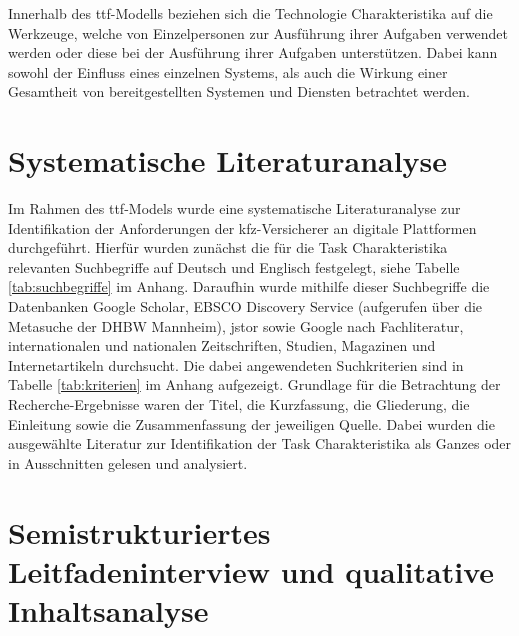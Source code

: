 Innerhalb des \acs{ttf}-Modells beziehen sich die Technologie Charakteristika auf die Werkzeuge, welche von Einzelpersonen zur Ausführung ihrer Aufgaben verwendet werden oder diese bei der Ausführung ihrer Aufgaben unterstützen.\autocite[Vgl.][S. 399]{SPIES2020} Dabei kann sowohl der Einfluss eines einzelnen Systems, als auch die Wirkung einer Gesamtheit von bereitgestellten Systemen und Diensten betrachtet werden. \autocite[Vgl.][S. 216]{GOODHUE1995}





\section{Systematische Literaturanalyse}


Im Rahmen des \acs{ttf}-Models wurde eine systematische Literaturanalyse zur Identifikation der Anforderungen der \ac{kfz}-Versicherer an digitale Plattformen durchgeführt. Hierfür wurden zunächst die für die Task Charakteristika relevanten Suchbegriffe auf Deutsch und Englisch festgelegt, siehe Tabelle \ref{tab:suchbegriffe} im Anhang. Daraufhin wurde mithilfe dieser Suchbegriffe die Datenbanken Google Scholar, EBSCO Discovery Service (aufgerufen über die Metasuche der DHBW Mannheim), \ac{jstor} sowie Google nach Fachliteratur, internationalen und nationalen Zeitschriften, Studien, Magazinen und Internetartikeln durchsucht. Die dabei angewendeten Suchkriterien sind in Tabelle \ref{tab:kriterien} im Anhang aufgezeigt. Grundlage für die Betrachtung der Recherche-Ergebnisse waren der Titel, die Kurzfassung, die Gliederung, die Einleitung sowie die Zusammenfassung der jeweiligen Quelle. Dabei wurden die ausgewählte Literatur zur Identifikation der Task Charakteristika als Ganzes oder in Ausschnitten gelesen und analysiert. \autocite[Vgl.][]{SOLIS2021}





\section{Semistrukturiertes Leitfadeninterview und qualitative Inhaltsanalyse}

